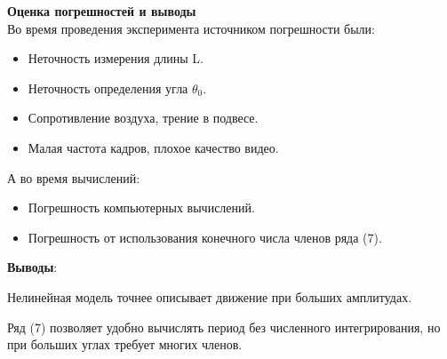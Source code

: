 \documentclass{beamer}
\begin{document}
	\newpage
	
	\large \textbf{\textcolor{structure.fg}{Оценка погрешностей и выводы}}\\
	Во время проведения эксперимента источником погрешности были:
	\begin{itemize}
		\item Неточность измерения длины L.
		\item Неточность определения угла \(\theta_0\).
		\item Сопротивление воздуха, трение в подвесе.
		\item Малая частота кадров, плохое качество видео.
	\end{itemize}
	А во время вычислений:
	\begin{itemize}
		\item Погрешность компьютерных вычислений.
		\item Погрешность от использования конечного числа членов ряда (7).
	\end{itemize}
	\textbf{Выводы}:
	
	Нелинейная модель точнее описывает движение при больших амплитудах.
	
	Ряд (7) позволяет удобно вычислять период без численного интегрирования, но при больших углах требует многих членов.
	
\end{document}

